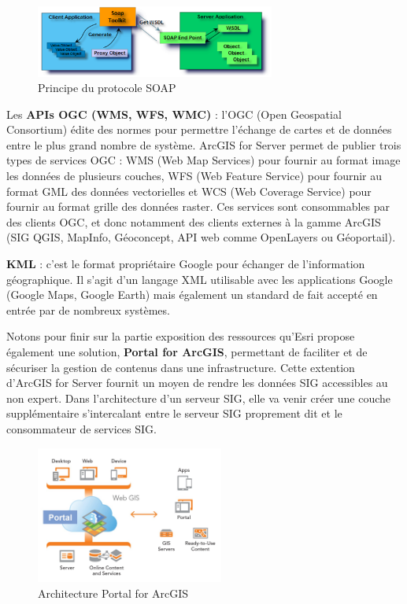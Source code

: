 \documentclass[11pt]{article}
\begin{document}
\begin{figure}[H]
	\center \includegraphics[width=0.70\textwidth]{img/cours/api_soap.png}
	\caption{Principe du protocole SOAP}
\end{figure}

Les \textbf{APIs OGC (WMS, WFS, WMC)} : l’OGC (Open Geospatial Consortium) édite des normes pour permettre l’échange de cartes et de données entre le plus grand nombre de système. ArcGIS for Server permet de publier trois types de services OGC : WMS (Web Map Services) pour fournir au format image les données de plusieurs couches, WFS (Web Feature Service) pour fournir au format GML des données vectorielles et WCS (Web Coverage Service) pour fournir au format grille des données raster. Ces services sont consommables par des clients OGC, et donc notamment des clients externes à la gamme ArcGIS (SIG QGIS, MapInfo, Géoconcept, API web comme OpenLayers ou Géoportail).

\textbf{KML} : c’est le format propriétaire Google pour échanger de l’information géographique. Il s’agit d’un langage XML utilisable avec les applications Google (Google Maps, Google Earth) mais également un standard de fait accepté en entrée par de nombreux systèmes.

Notons pour finir sur la partie exposition des ressources qu'Esri propose également une solution, \textbf{Portal for ArcGIS}, permettant de faciliter et de sécuriser la gestion de contenus dans une infrastructure. Cette extention d'ArcGIS for Server fournit un moyen de rendre les données SIG accessibles au non expert. Dans l'architecture d'un serveur SIG, elle va venir créer une couche supplémentaire s’intercalant entre le serveur SIG proprement dit et le consommateur de services SIG.

\begin{figure}[H]
	\center \includegraphics[width=0.55\textwidth]{img/cours/portal_for_arcgis.jpg}
	\caption{Architecture Portal for ArcGIS}
\end{figure}
\end{document}
